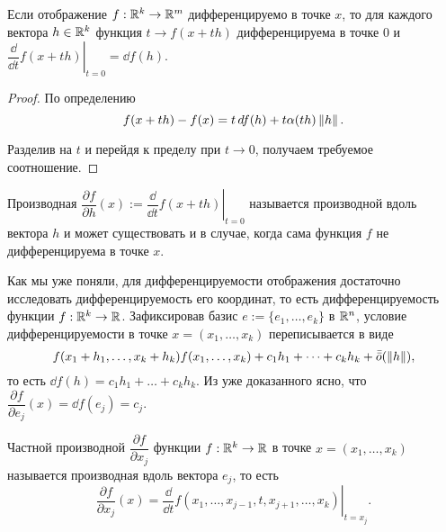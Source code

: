 \documentclass[a4paper]{article}
\theoremstyle{named}
\begin{document}
    \begin{lemma*}
        Если отображение $f: \mathbb{R}^k \to \mathbb{R}^m$ дифференцируемо в точке $x$, то для каждого вектора $h \in \mathbb{R}^k$ функция $t \to f(x + th)$ дифференцируема в точке $0$ и $\left.\dfrac{\dd}{\dd t}f(x + th)\right|_{t = 0} = \dd f(h)$.
    \end{lemma*}

    \begin{proof}
        По определению 
        \begin{equation*}
            f(x + th) - f(x) = t \mathop{}\!d f(h) + t \alpha(th)\left\lVert h\right\rVert.
        \end{equation*}

        Разделив на $t$ и перейдя к пределу при $t \to 0$, получаем требуемое соотношение.
    \end{proof}

    \begin{definition*}
        Производная $\dfrac{\partial f}{\partial h}(x) := \left.\dfrac{\dd}{\dd t}f(x + th)\right|_{t = 0}$ называется производной вдоль вектора $h$ и может существовать и в случае, когда сама функция $f$ не дифференцируема в точке $x$.
    \end{definition*}

    Как мы уже поняли, для дифференцируемости отображения достаточно исследовать дифференцируемость его координат, то есть дифференцируемость функции $f: \mathbb{R}^k \to \mathbb{R}$. Зафиксировав базис $e := \{e_1, \dots, e_k\}$ в $\mathbb{R}^n$, условие дифференцируемости в точке $x = (x_1, \dots, x_k)$ переписывается в виде
    \begin{equation*}
        f(x_1 + h_1, \dots, x_k + h_k) f(x_1, \dots, x_k) + c_1h_1 + \dots + c_k h_k + \bar{\bar{o}}(\left\lVert h\right\rVert),
    \end{equation*}
    то есть $\dd f(h) = c_1h_1 + \dots + c_kh_k$. Из уже доказанного ясно, что $\dfrac{\partial f}{\partial e_j}(x) = \dd f(e_j) = c_j$.

    \begin{definition*}
        Частной производной $\dfrac{\partial f}{\partial x_j}$ функции $f: \mathbb{R}^k \to \mathbb{R}$ в точке $x = (x_1, \dots, x_k)$ называется производная вдоль вектора $e_j$, то есть
        \begin{equation*}
            \dfrac{\partial f}{\partial x_j}(x) = \left.\dfrac{\dd}{\dd t}f(x_1, \dots, x_{j - 1}, t, x_{j + 1}, \dots, x_k)\right|_{t = x_j}.
        \end{equation*}
    \end{definition*}
\end{document}

